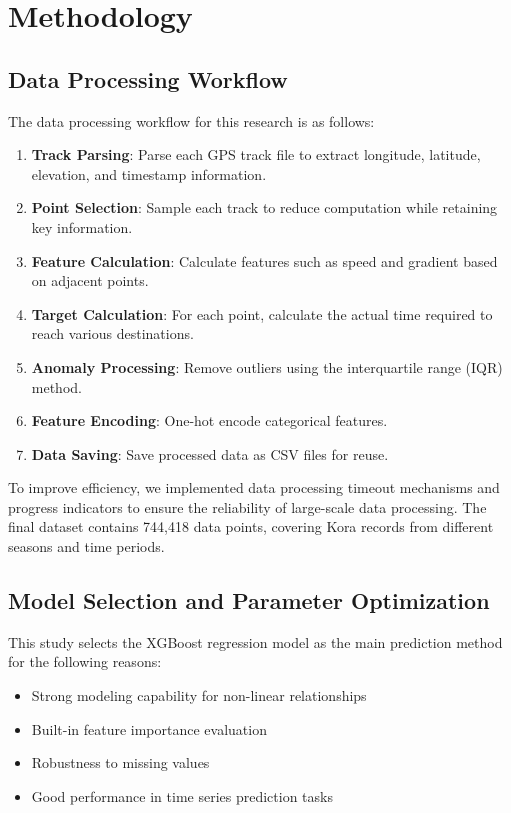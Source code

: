 \documentclass[12pt]{article}
\begin{document}
\section{Methodology}

\subsection{Data Processing Workflow}

The data processing workflow for this research is as follows:

\begin{enumerate}
  \item \textbf{Track Parsing}: Parse each GPS track file to extract longitude, latitude, elevation, and timestamp information.
  \item \textbf{Point Selection}: Sample each track to reduce computation while retaining key information.
  \item \textbf{Feature Calculation}: Calculate features such as speed and gradient based on adjacent points.
  \item \textbf{Target Calculation}: For each point, calculate the actual time required to reach various destinations.
  \item \textbf{Anomaly Processing}: Remove outliers using the interquartile range (IQR) method.
  \item \textbf{Feature Encoding}: One-hot encode categorical features.
  \item \textbf{Data Saving}: Save processed data as CSV files for reuse.
\end{enumerate}

To improve efficiency, we implemented data processing timeout mechanisms and progress indicators to ensure the reliability of large-scale data processing. The final dataset contains 744,418 data points, covering Kora records from different seasons and time periods.

\subsection{Model Selection and Parameter Optimization}

This study selects the XGBoost regression model as the main prediction method for the following reasons:

\begin{itemize}
  \item Strong modeling capability for non-linear relationships
  \item Built-in feature importance evaluation
  \item Robustness to missing values
  \item Good performance in time series prediction tasks
\end{itemize}
\end{document}
